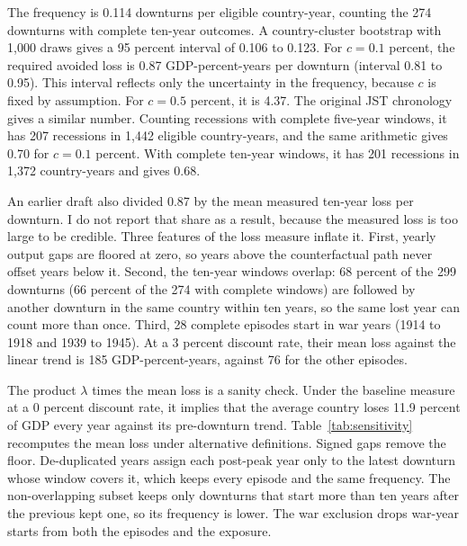 \documentclass[11pt]{article}
\begin{document}
The frequency is 0.114 downturns per eligible country-year, counting the 274 downturns with
complete ten-year outcomes. A country-cluster bootstrap with 1,000 draws gives a 95 percent
interval of 0.106 to 0.123. For $c=0.1$ percent, the required avoided loss is 0.87
GDP-percent-years per downturn (interval 0.81 to 0.95). This interval reflects only the
uncertainty in the frequency, because $c$ is fixed by assumption. For $c=0.5$ percent, it is
4.37. The original JST chronology gives a similar number. Counting recessions with complete
five-year windows, it has 207 recessions in 1,442 eligible country-years, and the same
arithmetic gives 0.70 for $c=0.1$ percent. With complete ten-year windows, it has 201
recessions in 1,372 country-years and gives 0.68.

An earlier draft also divided 0.87 by the mean measured ten-year loss per downturn. I do
not report that share as a result, because the measured loss is too large to be credible.
Three features of the loss measure inflate it. First, yearly output gaps are floored at
zero, so years above the counterfactual path never offset years below it. Second, the
ten-year windows overlap: 68 percent of the 299 downturns (66 percent of the 274 with
complete windows) are followed by another downturn in the same country within ten years, so
the same lost year can count more than once. Third, 28 complete episodes start in war years
(1914 to 1918 and 1939 to 1945). At a 3 percent discount rate, their mean loss against the
linear trend is 185 GDP-percent-years, against 76 for the other episodes.

The product $\lambda$ times the mean loss is a sanity check. Under the baseline measure at a
0 percent discount rate, it implies that the average country loses 11.9 percent of GDP every
year against its pre-downturn trend. Table~\ref{tab:sensitivity} recomputes the mean loss
under alternative definitions. Signed gaps remove the floor. De-duplicated years assign each
post-peak year only to the latest downturn whose window covers it, which keeps every episode
and the same frequency. The non-overlapping subset keeps only downturns that start more than
ten years after the previous kept one, so its frequency is lower. The war exclusion drops
war-year starts from both the episodes and the exposure.
\end{document}

